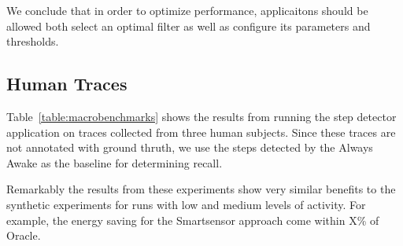 We conclude that in order to optimize performance, applicaitons should
be allowed both select an optimal filter as well as configure its
parameters and thresholds.

\subsection{Human Traces}

Table~\ref{table:macrobenchmarks} shows the results from running the
step detector application on traces collected from three human
subjects.  Since these traces are not annotated with ground thruth, we
use the steps detected by the Always Awake as the baseline for
determining recall.

Remarkably the results from these experiments show very similar
benefits to the synthetic experiments for runs with low and medium
levels of activity.  For example, the energy saving for the
Smartsensor approach come within X\% of Oracle.


